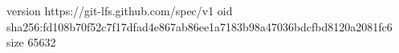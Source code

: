 version https://git-lfs.github.com/spec/v1
oid sha256:fd108b70f52c7f17dfad4e867ab86ee1a7183b98a47036bdcfbd8120a2081fc6
size 65632
